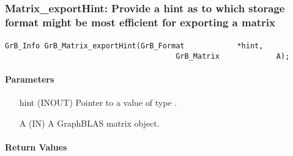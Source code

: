 
\subsubsection{{\sf Matrix\_exportHint}: Provide a hint as to which storage format might be most efficient for exporting a matrix }
\label{Sec:Matrix_exportHint}

\paragraph{\syntax}

\begin{Verbatim}[samepage=true]    
        GrB_Info GrB_Matrix_exportHint(GrB_Format            *hint,
                                       GrB_Matrix             A);
\end{Verbatim}

\paragraph{Parameters}

\begin{itemize}[leftmargin=1.1in]
    \item[{\sf hint}] ({\sf INOUT}) Pointer to a value of type .
    \item[{\sf A}]      ({\sf IN}) A GraphBLAS matrix object.
\end{itemize}

\paragraph{Return Values}

